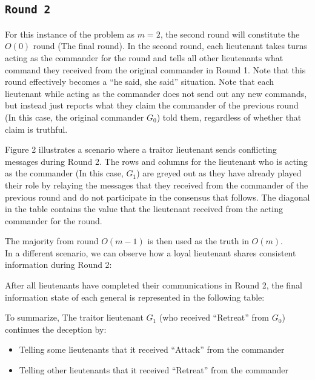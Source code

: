 \documentclass[11pt]{article}
\newcommand{\gen}[1]{\ensuremath{G_{#1}}}
\begin{document}
\subsection*{\texttt{\large Round 2}}
\justifying
For this instance of the problem as $m=2$, the second round will constitute the $O(0)$ round (The final round).
In the second round, each lieutenant takes turns acting as the commander for the round and tells all other lieutenants what command they received from the original commander in Round 1.
Note that this round effectively becomes a ``he said, she said'' situation. Note that each lieutenant while acting as the commander does not send out any new commands, but instead just reports what they claim the commander of the previous round (In this case, the original commander $\gen{0}$) told them, regardless of whether that claim is truthful.

Figure 2 illustrates a scenario where a traitor lieutenant sends conflicting messages during Round 2. The rows and columns for the lieutenant who is acting as the commander (In this case, $\gen{1}$) are greyed out as they have already played their role by relaying the messages that they received from the commander of the previous round and do not participate in the consensus that follows. The diagonal in the table contains the value that the lieutenant received from the acting commander for the round.

\begin{center}
    
\end{center}

\justifying
The majority from round $O(m-1)$ is then used as the truth in $O(m)$.\\

In a different scenario, we can observe how a loyal lieutenant shares consistent information during Round 2:



\justifying
After all lieutenants have completed their communications in Round 2, the final information state of each general is represented in the following table:

\begin{center}
    
\end{center}

\justifying
To summarize, The traitor lieutenant $\gen{1}$ (who received ``Retreat'' from $\gen{0}$) continues the deception by:
\begin{itemize}
    \item Telling some lieutenants that it received ``Attack'' from the commander
    \item Telling other lieutenants that it received ``Retreat'' from the commander
\end{itemize}
\end{document}
